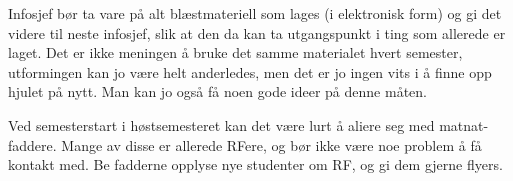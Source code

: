 Infosjef bør ta vare på alt blæstmateriell som lages (i elektronisk
form) og gi det videre til neste infosjef, slik at den da kan ta
utgangspunkt i ting som allerede er laget. Det er ikke meningen å bruke
det samme materialet hvert semester, utformingen kan jo være helt
anderledes, men det er jo ingen vits i å finne opp hjulet på nytt.
Man kan jo også få noen gode ideer på denne måten.

Ved semesterstart i høstsemesteret kan det være lurt å aliere seg med matnat-faddere. Mange av disse er allerede RFere, og bør ikke være noe problem å få kontakt med. Be fadderne opplyse nye studenter om RF, og gi dem gjerne flyers.
